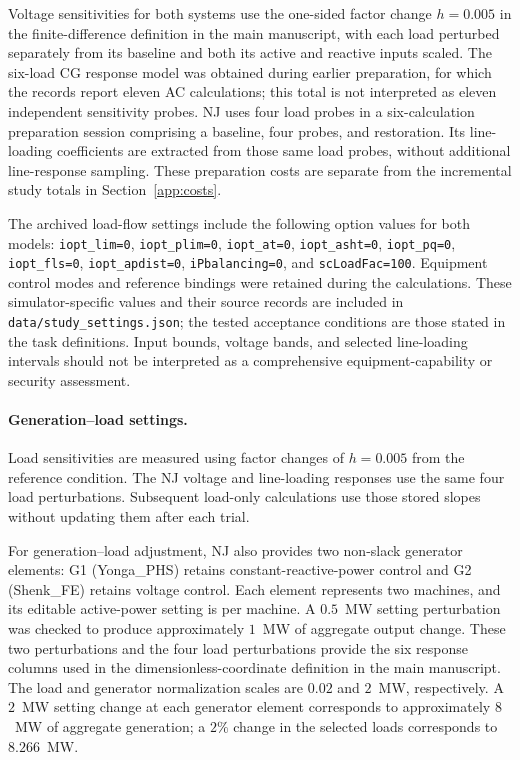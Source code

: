 Voltage sensitivities for both systems use the one-sided factor change $h=0.005$ in the finite-difference definition in the main manuscript, with each load perturbed separately from its baseline and both its active and reactive inputs scaled. The six-load CG response model was obtained during earlier preparation, for which the records report eleven AC calculations; this total is not interpreted as eleven independent sensitivity probes. NJ uses four load probes in a six-calculation preparation session comprising a baseline, four probes, and restoration. Its line-loading coefficients are extracted from those same load probes, without additional line-response sampling. These preparation costs are separate from the incremental study totals in Section~\ref{app:costs}.

The archived load-flow settings include the following option values for both models: \texttt{iopt\_lim=0}, \texttt{iopt\_plim=0}, \texttt{iopt\_at=0}, \texttt{iopt\_asht=0}, \texttt{iopt\_pq=0}, \texttt{iopt\_fls=0}, \texttt{iopt\_apdist=0}, \texttt{iPbalancing=0}, and \texttt{scLoadFac=100}. Equipment control modes and reference bindings were retained during the calculations. These simulator-specific values and their source records are included in \texttt{data/study\_settings.json}; the tested acceptance conditions are those stated in the task definitions. Input bounds, voltage bands, and selected line-loading intervals should not be interpreted as a comprehensive equipment-capability or security assessment.

\paragraph{Generation--load settings.}
Load sensitivities are measured using factor changes of $h=0.005$ from the reference condition. The NJ voltage and line-loading responses use the same four load perturbations. Subsequent load-only calculations use those stored slopes without updating them after each trial.

For generation--load adjustment, NJ also provides two non-slack generator elements: G1 (Yonga\_PHS) retains constant-reactive-power control and G2 (Shenk\_FE) retains voltage control. Each element represents two machines, and its editable active-power setting is per machine. A $0.5$~MW setting perturbation was checked to produce approximately $1$~MW of aggregate output change. These two perturbations and the four load perturbations provide the six response columns used in the dimensionless-coordinate definition in the main manuscript. The load and generator normalization scales are $0.02$ and $2$~MW, respectively. A $2$~MW setting change at each generator element corresponds to approximately $8$~MW of aggregate generation; a $2\%$ change in the selected loads corresponds to $8.266$~MW.

